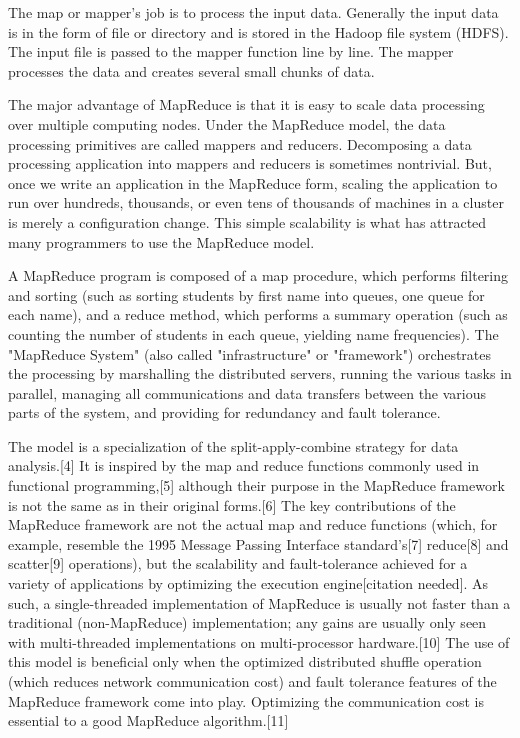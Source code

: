 \documentclass[11pt]{book}
\begin{document}
The map or mapper’s job is to process the input data. Generally the input data is in the form of file or directory and is stored in the Hadoop file system (HDFS). The input file is passed to the mapper function line by line. The mapper processes the data and creates several small chunks of data.


The major advantage of MapReduce is that it is easy to scale data processing over multiple computing nodes. Under the MapReduce model, the data processing primitives are called mappers and reducers. Decomposing a data processing application into mappers and reducers is sometimes nontrivial. But, once we write an application in the MapReduce form, scaling the application to run over hundreds, thousands, or even tens of thousands of machines in a cluster is merely a configuration change. This simple scalability is what has attracted many programmers to use the MapReduce model.


A MapReduce program is composed of a map procedure, which performs filtering and sorting (such as sorting students by first name into queues, one queue for each name), and a reduce method, which performs a summary operation (such as counting the number of students in each queue, yielding name frequencies). The "MapReduce System" (also called "infrastructure" or "framework") orchestrates the processing by marshalling the distributed servers, running the various tasks in parallel, managing all communications and data transfers between the various parts of the system, and providing for redundancy and fault tolerance.

The model is a specialization of the split-apply-combine strategy for data analysis.[4] It is inspired by the map and reduce functions commonly used in functional programming,[5] although their purpose in the MapReduce framework is not the same as in their original forms.[6] The key contributions of the MapReduce framework are not the actual map and reduce functions (which, for example, resemble the 1995 Message Passing Interface standard's[7] reduce[8] and scatter[9] operations), but the scalability and fault-tolerance achieved for a variety of applications by optimizing the execution engine[citation needed]. As such, a single-threaded implementation of MapReduce is usually not faster than a traditional (non-MapReduce) implementation; any gains are usually only seen with multi-threaded implementations on multi-processor hardware.[10] The use of this model is beneficial only when the optimized distributed shuffle operation (which reduces network communication cost) and fault tolerance features of the MapReduce framework come into play. Optimizing the communication cost is essential to a good MapReduce algorithm.[11]
\end{document}
